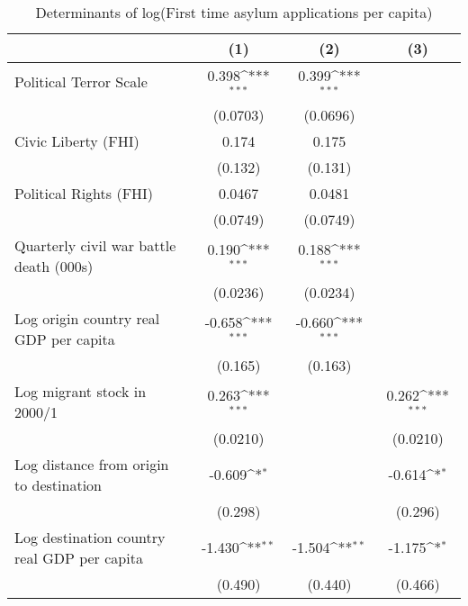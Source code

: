 \begin{table}[htbp]\centering
\def\sym#1{\ifmmode^{#1}\else\(^{#1}\)\fi}
\caption{Determinants of log(First time asylum applications per capita)}
\begin{tabular}{l*{3}{c}}
\hline\hline
                    &\multicolumn{1}{c}{(1)}         &\multicolumn{1}{c}{(2)}         &\multicolumn{1}{c}{(3)}         \\
\hline
Political Terror Scale&       0.398\sym{***}&       0.399\sym{***}&                     \\
                    &    (0.0703)         &    (0.0696)         &                     \\
[1em]
Civic Liberty (FHI) &       0.174         &       0.175         &                     \\
                    &     (0.132)         &     (0.131)         &                     \\
[1em]
Political Rights (FHI)&      0.0467         &      0.0481         &                     \\
                    &    (0.0749)         &    (0.0749)         &                     \\
[1em]
Quarterly civil war battle death (000s)&       0.190\sym{***}&       0.188\sym{***}&                     \\
                    &    (0.0236)         &    (0.0234)         &                     \\
[1em]
Log origin country real GDP per capita&      -0.658\sym{***}&      -0.660\sym{***}&                     \\
                    &     (0.165)         &     (0.163)         &                     \\
[1em]
Log migrant stock in 2000/1&       0.263\sym{***}&                     &       0.262\sym{***}\\
                    &    (0.0210)         &                     &    (0.0210)         \\
[1em]
Log distance from origin to destination&      -0.609\sym{*}  &                     &      -0.614\sym{*}  \\
                    &     (0.298)         &                     &     (0.296)         \\
[1em]
Log destination country real GDP per capita&      -1.430\sym{**} &      -1.504\sym{**} &      -1.175\sym{*}  \\
                    &     (0.490)         &     (0.440)         &     (0.466)         \\

\end{tabular}
\end{table}
